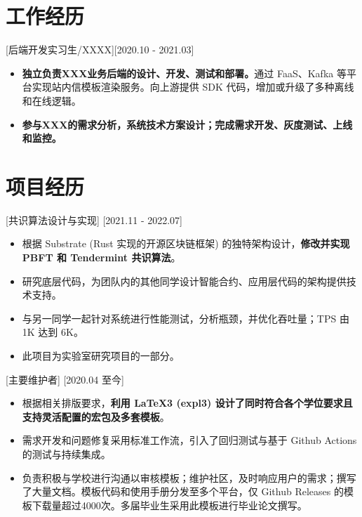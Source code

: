 \documentclass{resume}
\begin{document}
\section{工作经历}

[后端开发实习生/XXXX][2020.10 - 2021.03] 
\begin{itemize}
  \item \textbf{独立负责XXX业务后端的设计、开发、测试和部署。}通过 FaaS、Kafka 等平台实现站内信模板渲染服务。向上游提供 SDK 代码，增加或升级了多种离线和在线逻辑。
  \item \textbf{参与XXX的需求分析，系统技术方案设计；完成需求开发、灰度测试、上线和监控。}
\end{itemize}

\section{项目经历}

[共识算法设计与实现]
[2021.11 - 2022.07] 

\begin{itemize}
  \item 根据 Substrate (Rust 实现的开源区块链框架) 的独特架构设计，\textbf{修改并实现 PBFT 和 Tendermint 共识算法}。
  \item 研究底层代码，为团队内的其他同学设计智能合约、应用层代码的架构提供技术支持。
  \item 与另一同学一起针对系统进行性能测试，分析瓶颈，并优化吞吐量；TPS 由 1K 达到 6K。
  \item 此项目为实验室研究项目的一部分。
\end{itemize}

[主要维护者]
[2020.04 至今]

\begin{itemize}
  \item 根据相关排版要求，\textbf{利用 LaTeX3 (expl3) 设计了同时符合各个学位要求且支持灵活配置的宏包及多套模板}。
  \item 需求开发和问题修复采用标准工作流，引入了回归测试与基于 Github Actions 的测试与持续集成。
  \item 负责积极与学校进行沟通以审核模板；维护社区，及时响应用户的需求；撰写了大量文档。模板代码和使用手册分发至多个平台，仅 Github Releases 的模板下载量超过4000次。多届毕业生采用此模板进行毕业论文撰写。
\end{itemize}
\end{document}
